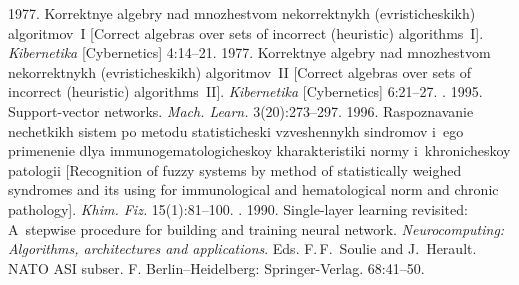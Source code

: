   \begin{multicols}{2}

\renewcommand{\bibname}{\protect\rmfamily References}

{\small\frenchspacing
 {%
 \begin{thebibliography}{99}

 1977. Korrektnye algebry nad mno\-zhe\-st\-vom nekorrektnykh 
(evristicheskikh) algoritmov~I 
[Correct algebras over sets of incorrect (heuristic) algorithms~I]. 
\textit{Kibernetika} [Cybernetics] 4:14--21.
 1977. Korrektnye algebry nad mno\-zhe\-st\-vom nekorrektnykh 
(evristicheskikh) algoritmov~II 
[Correct algebras over sets of incorrect (heuristic) algorithms~II].
\textit{Kibernetika} [Cybernetics] 6:21--27.
. 1995. Support-vector networks. 
\textit{Mach. Learn.} 3(20):273--297.
 1996. 
Raspoznavanie nechetkikh sistem po metodu statisticheski vzveshennykh sindromov 
i~ego primenenie dlya immunogematologicheskoy kha\-rak\-te\-ri\-sti\-ki normy i~khronicheskoy 
patologii
[Recognition of fuzzy systems by method of statistically weighed syndromes 
and its using for immunological and hematological norm and chronic pathology].
\textit{Khim. Fiz.} 15(1):81--100.
. 1990. 
Single-layer learning revisited: A~stepwise procedure for building and training 
neural network. 
\textit{Neurocomputing: Algorithms, architectures and applications}. Eds. F.\,F.~Soulie and 
J.~Herault.
NATO ASI subser. F. Berlin--Heidelberg:
    Springer-Verlag. 68:41--50.


\end{thebibliography}}}
\end{multicols}
